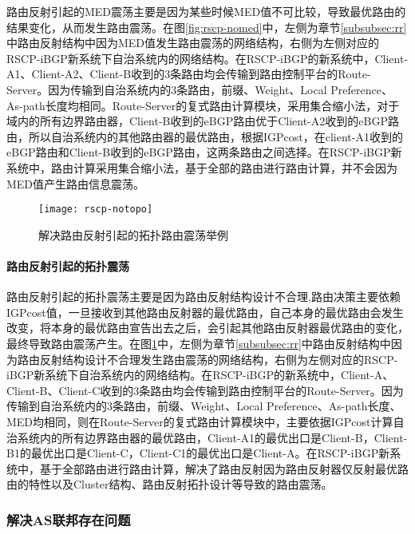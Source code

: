 路由反射引起的MED震荡主要是因为某些时候MED值不可比较，导致最优路由的结果变化，从而发生路由震荡。在图\ref{fig:rscp-nomed}中，左侧为章节\ref{subsubsec:rr}中路由反射结构中因为MED值发生路由震荡的网络结构，右侧为左侧对应的RSCP-iBGP新系统下自治系统内的网络结构。在RSCP-iBGP的新系统中，Client-A1、Client-A2、Client-B收到的3条路由均会传输到路由控制平台的Route-Server。因为传输到自治系统内的3条路由，前缀、Weight、Local Preference、As-path长度均相同。Route-Server的复式路由计算模块，采用集合缩小法，对于域内的所有边界路由器，Client-B收到的eBGP路由优于Client-A2收到的eBGP路由，所以自治系统内的其他路由器的最优路由，根据IGPcost，在client-A1收到的eBGP路由和Client-B收到的eBGP路由，这两条路由之间选择。在RSCP-iBGP新系统中，路由计算采用集合缩小法，基于全部的路由进行路由计算，并不会因为MED值产生路由信息震荡。\\


\begin{figure}
  \centering
  \texttt{[image: rscp-notopo]}
  \caption{解决路由反射引起的拓扑路由震荡举例}
  \label{fig:rscp-notopo}
\end{figure}

\paragraph{路由反射引起的拓扑震荡}

路由反射引起的拓扑震荡主要是因为路由反射结构设计不合理,路由决策主要依赖IGPcost值，一旦接收到其他路由反射器的最优路由，自己本身的最优路由会发生改变，将本身的最优路由宣告出去之后，会引起其他路由反射器最优路由的变化，最终导致路由震荡产生。在图\ref{fig:rscp-notopo}中，左侧为章节\ref{subsubsec:rr}中路由反射结构中因为路由反射结构设计不合理发生路由震荡的网络结构，右侧为左侧对应的RSCP-iBGP新系统下自治系统内的网络结构。在RSCP-iBGP的新系统中，Client-A、Client-B、Client-C收到的3条路由均会传输到路由控制平台的Route-Server。因为传输到自治系统内的3条路由，前缀、Weight、Local Preference、As-path长度、MED均相同，则在Route-Server的复式路由计算模块中，主要依据IGPcost计算自治系统内的所有边界路由器的最优路由，Client-A1的最优出口是Client-B，Client-B1的最优出口是Client-C，Client-C1的最优出口是Client-A。在RSCP-iBGP新系统中，基于全部路由进行路由计算，解决了路由反射因为路由反射器仅反射最优路由的特性以及Cluster结构、路由反射拓扑设计等导致的路由震荡。

\subsubsection{解决AS联邦存在问题}


